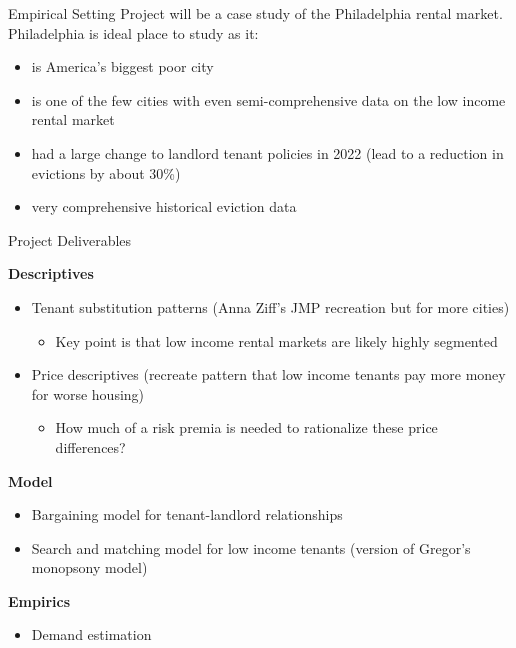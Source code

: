 \documentclass[10pt, xcolor=dvipsnames]{beamer}
\begin{document}
    

\begin{frame}{Empirical Setting}
    Project will be a case study of the Philadelphia rental market.\\

    Philadelphia is ideal place to study as it:

    \begin{itemize}
        \item is America's biggest poor city
        \item is one of the few cities with even semi-comprehensive data on the low income rental market
        \item had a large change to landlord tenant policies in 2022 (lead to a reduction in evictions by about 30\%)
        \item very comprehensive historical eviction data
    \end{itemize}
    
\end{frame}


\begin{frame}{Project Deliverables}

\textbf{Descriptives}\\
    \begin{itemize}
        \item Tenant substitution patterns (Anna Ziff's JMP recreation but for more cities)
        \begin{itemize}
            \item Key point is that low income rental markets are likely highly segmented
        \end{itemize}
        \item Price descriptives (recreate pattern that low income tenants pay more money for worse housing)
        \begin{itemize}
            \item How much of a risk premia is needed to rationalize these price differences?
        \end{itemize}
    \end{itemize}

\textbf{Model}\\
\begin{itemize}
    \item Bargaining model for tenant-landlord relationships
    \item Search and matching model for low income tenants (version of Gregor's monopsony model)
\end{itemize}
\textbf{Empirics}\\
\begin{itemize}
    \item Demand estimation
\end{itemize}

\end{frame}
\end{document}
